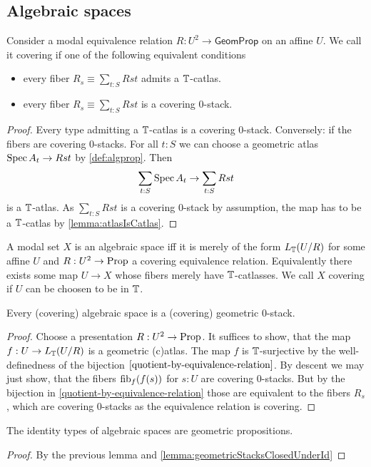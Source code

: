 \subsection{Algebraic spaces}
\begin{definition}{\label{def:coveringEqRel}}
		Consider a modal equivalence relation $R : U^2 \to \mathsf{GeomProp}$ on an affine $U$. We call it covering if one of the following equivalent conditions
		\begin{itemize}
			\item  every fiber $R_s \equiv \sum_{t: S} R s t$ admits a $\mathbb{T}$-catlas.
			\item  every fiber $R_s \equiv \sum_{t: S} R s t$ is a covering 0-stack.
\end{itemize}
\end{definition}
\begin{proof}
Every type admitting a $\mathbb{T}$-catlas is a covering 0-stack. 
Conversely: if the fibers are covering 0-stacks. For all $t : S$ we can choose a geometric atlas $\operatorname{Spec} A_t \to R s t$ by \ref{def:algprop}. Then 
\[
\sum_{t:S} \operatorname{Spec} A_t \to \sum_{t : S} R s t
\]
is a $\mathbb{T}$-atlas. As $\sum_{t : S} R s t$ is a covering 0-stack by assumption, the map has to be a $\mathbb{T}$-catlas by \ref{lemma:atlasIsCatlas}. 
\end{proof}


\begin{definition}
	A modal set $X$ is an algebraic space iff it is merely of the form $L_{\mathbb{T}} (U / R)$ for some affine $U$ and  $R : U^2 \to \operatorname{Prop}$ a covering equivalence relation. Equivalently there exists some map $U \to X$ whose fibers merely have $\mathbb{T}$-catlasses. We call $X$ covering if $U$ can be choosen to be in $\mathbb{T}$.
\end{definition}
\begin{lemma}
	Every (covering) algebraic space is a (covering) geometric 0-stack.

\end{lemma}
\begin{proof}
	Choose a presentation $ R: U^2 \to \operatorname{Prop}$.
	It suffices to show, that the map $f : U \to L_{\mathbb{T}} ( U / R)$ is a geometric (c)atlas. The map $f$ is $\mathbb{T}$-surjective by the well-definedness of the bijection $\ref{quotient-by-equivalence-relation}$. By descent we may just show, that the fibers $\operatorname{fib}_f (f(s))$ for $s : U$ are covering 0-stacks. But by the bijection in \ref{quotient-by-equivalence-relation} those are equivalent to the fibers $R_s$, which are covering 0-stacks as the equivalence relation is covering.
\end{proof}
\begin{corollary}
	The identity types of algebraic spaces are geometric propositions.
\end{corollary}
\begin{proof}
	By the previous lemma and \ref{lemma:geometricStacksClosedUnderId}
\end{proof}

